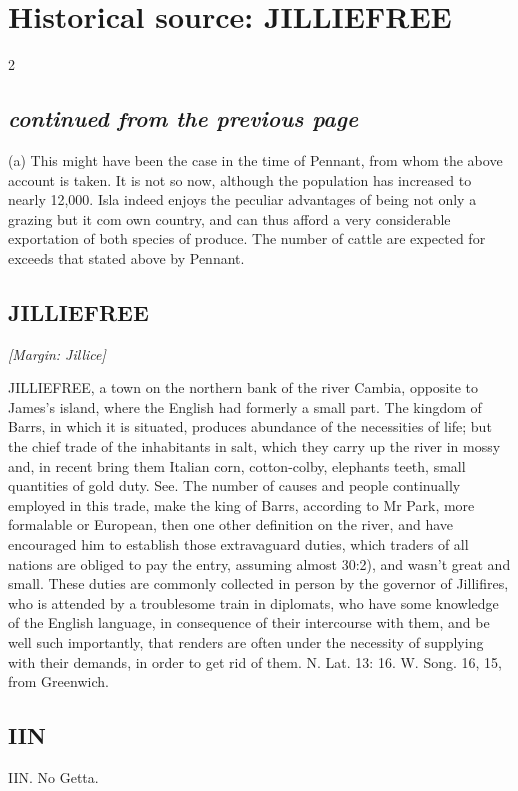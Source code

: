 \documentclass[10pt]{article}
\begin{document}
\section*{Historical source: JILLIEFREE}
\begin{multicols}{2}
\subsection*{\textit{continued from the previous page}}
(a) This might have been the case in the time of Pennant, from whom the above account is taken. It is not so now, although the population has increased to nearly 12,000. Isla indeed enjoys the peculiar advantages of being not only a grazing but it com own country, and can thus afford a very considerable exportation of both species of produce. The number of cattle are expected for exceeds that stated above by Pennant.

\subsection*{JILLIEFREE}
{\small\itshape [Margin: Jillice]}\par
JILLIEFREE, a town on the northern bank of the river Cambia, opposite to James’s island, where the English had formerly a small part. The kingdom of Barrs, in which it is situated, produces abundance of the necessities of life; but the chief trade of the inhabitants in salt, which they carry up the river in mossy and, in recent bring them Italian corn, cotton-colby, elephants teeth, small quantities of gold duty. See. The number of causes and people continually employed in this trade, make the king of Barrs, according to Mr Park, more formalable or European, then one other definition on the river, and have encouraged him to establish those extravaguard duties, which traders of all nations are obliged to pay the entry, assuming almost 30:2), and wasn't great and small. These duties are commonly collected in person by the governor of Jillifires, who is attended by a troublesome train in diplomats, who have some knowledge of the English language, in consequence of their intercourse with them, and be well such importantly, that renders are often under the necessity of supplying with their demands, in order to get rid of them. N. Lat. 13: 16. W. Song. 16, 15, from Greenwich.

\subsection*{IIN}
IIN. No Getta.


\end{multicols}
\end{document}
